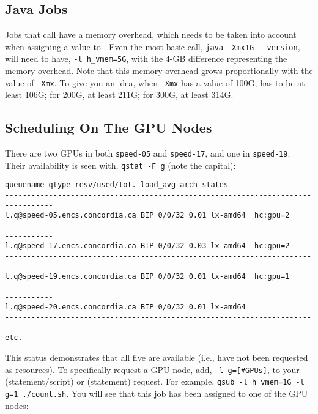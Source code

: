 \documentclass{easychair}
\begin{document}
\subsection{Java Jobs}

Jobs that call  have a memory overhead, which needs to be taken into account when assigning a value to . Even the most basic  call, \texttt{java -Xmx1G - version}, will need to have, \texttt{-l h\_vmem=5G}, with the 4-GB difference representing the memory overhead. Note that this memory overhead grows proportionally with the value of \texttt{-Xmx}. To give you an idea, when \texttt{-Xmx} has a value of 100G,  has to be at least 106G; for 200G, at least 211G; for 300G, at least 314G. 

\subsection{Scheduling On The GPU Nodes}

There are two GPUs in both \texttt{speed-05} and \texttt{speed-17}, and one in \texttt{speed-19}. Their availability is seen with, \texttt{qstat -F g} (note the capital): 

\small
\begin{verbatim}
queuename qtype resv/used/tot. load_avg arch states
---------------------------------------------------------------------------------
l.q@speed-05.encs.concordia.ca BIP 0/0/32 0.01 lx-amd64  hc:gpu=2 
--------------------------------------------------------------------------------- 
l.q@speed-17.encs.concordia.ca BIP 0/0/32 0.03 lx-amd64  hc:gpu=2 
--------------------------------------------------------------------------------- 
l.q@speed-19.encs.concordia.ca BIP 0/0/32 0.01 lx-amd64  hc:gpu=1 
--------------------------------------------------------------------------------- 
l.q@speed-20.encs.concordia.ca BIP 0/0/32 0.01 lx-amd64
--------------------------------------------------------------------------------- 
etc. 
\end{verbatim}
\normalsize

This status demonstrates that all five are available (i.e., have not been requested as resources). To specifically request a GPU node, add, \texttt{-l g=[\#GPUs]}, to your  (statement/script) or  (statement) request. For example, \texttt{qsub -l h\_vmem=1G -l g=1 ./count.sh}. You will see that this job has been assigned to one of the GPU nodes:
\end{document}
